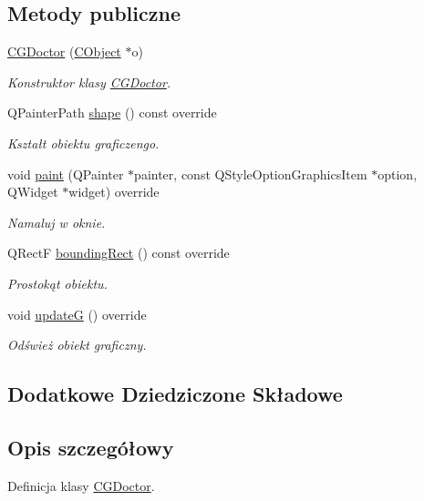 \subsection*{Metody publiczne}
\begin{DoxyCompactItemize}
\item 
\mbox{\hyperlink{class_c_g_doctor_afd2a771ff728d41580909a658af938c9}{C\+G\+Doctor}} (\mbox{\hyperlink{class_c_object}{C\+Object}} $\ast$o)
\begin{DoxyCompactList}\small\item\em Konstruktor klasy \mbox{\hyperlink{class_c_g_doctor}{C\+G\+Doctor}}. \end{DoxyCompactList}\item 
Q\+Painter\+Path \mbox{\hyperlink{class_c_g_doctor_abfb22c548f5d97fddef40b928b7d16bb}{shape}} () const override
\begin{DoxyCompactList}\small\item\em Kształt obiektu graficzengo. \end{DoxyCompactList}\item 
void \mbox{\hyperlink{class_c_g_doctor_a1a4b50cd9ab7f5a94a47d97e58c9475d}{paint}} (Q\+Painter $\ast$painter, const Q\+Style\+Option\+Graphics\+Item $\ast$option, Q\+Widget $\ast$widget) override
\begin{DoxyCompactList}\small\item\em Namaluj w oknie. \end{DoxyCompactList}\item 
Q\+RectF \mbox{\hyperlink{class_c_g_doctor_a54058ba434d8d7d0c6bf16c1a9f6536a}{bounding\+Rect}} () const override
\begin{DoxyCompactList}\small\item\em Prostokąt obiektu. \end{DoxyCompactList}\item 
void \mbox{\hyperlink{class_c_g_doctor_a601c4bccc44e7a44540079e873c5ea8f}{updateG}} () override
\begin{DoxyCompactList}\small\item\em Odśwież obiekt graficzny. \end{DoxyCompactList}\end{DoxyCompactItemize}
\subsection*{Dodatkowe Dziedziczone Składowe}


\subsection{Opis szczegółowy}
Definicja klasy \mbox{\hyperlink{class_c_g_doctor}{C\+G\+Doctor}}. 

